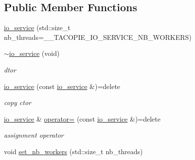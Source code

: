 \subsection*{Public Member Functions}
\begin{DoxyCompactItemize}
\item 
\hyperlink{classtacopie_1_1io__service_a62edde9b62571610413d99d075df8102}{io\+\_\+service} (std\+::size\+\_\+t nb\+\_\+threads=\+\_\+\+\_\+\+T\+A\+C\+O\+P\+I\+E\+\_\+\+I\+O\+\_\+\+S\+E\+R\+V\+I\+C\+E\+\_\+\+N\+B\+\_\+\+W\+O\+R\+K\+E\+RS)
\item 
\mbox{\label{classtacopie_1_1io__service_ae423d7e4b13f07fe41fb051345ffbf8d}} 
\hyperlink{classtacopie_1_1io__service_ae423d7e4b13f07fe41fb051345ffbf8d}{$\sim$io\+\_\+service} (void)
\begin{DoxyCompactList}\small\item\em dtor \end{DoxyCompactList}\item 
\mbox{\label{classtacopie_1_1io__service_ad5da7503d8fec083c6d28455ec9e21c7}} 
\hyperlink{classtacopie_1_1io__service_ad5da7503d8fec083c6d28455ec9e21c7}{io\+\_\+service} (const \hyperlink{classtacopie_1_1io__service}{io\+\_\+service} \&)=delete
\begin{DoxyCompactList}\small\item\em copy ctor \end{DoxyCompactList}\item 
\mbox{\label{classtacopie_1_1io__service_a980652008516b38357d405c16eda07fa}} 
\hyperlink{classtacopie_1_1io__service}{io\+\_\+service} \& \hyperlink{classtacopie_1_1io__service_a980652008516b38357d405c16eda07fa}{operator=} (const \hyperlink{classtacopie_1_1io__service}{io\+\_\+service} \&)=delete
\begin{DoxyCompactList}\small\item\em assignment operator \end{DoxyCompactList}\item 
void \hyperlink{classtacopie_1_1io__service_a7e2b0700c0a4591f86c344df8748b3a5}{set\+\_\+nb\+\_\+workers} (std\+::size\+\_\+t nb\+\_\+threads)
\item 
\mbox{\label{classtacopie_1_1io__service_a9f4c8bce3c0f6d660515b0b5eb109df8}} 

\end{DoxyCompactItemize}

